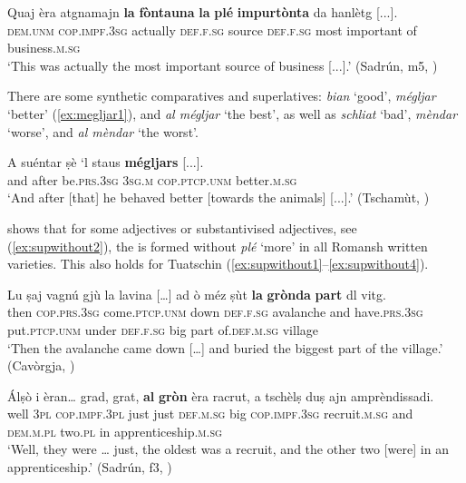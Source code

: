 \ea
\label{ex:sup3}
\gll Quaj èra atgnamajn \textbf{la} \textbf{fòntauna} \textbf{la} \textbf{plé} \textbf{impurtònta} da hanlètg [...].\\
\textsc{dem.unm} \textsc{cop.impf.3sg} actually  \textsc{def.f.sg} source \textsc{def.f.sg} most important of business.\textsc{m.sg}\\
\glt `This was actually the most important source of  business [...].' (Sadrún, m5, )
\z

There are some synthetic comparatives and superlatives: \textit{bian} `good', \textit{mégljar} `better' (\ref{ex:megljar1}), and  \textit{al mégljar} `the best', as well as \textit{schliat} `bad', \textit{mèndar} `worse', and \textit{al mèndar} `the worst'.

\ea
\label{ex:megljar1}
\gll A suéntar ṣè `l staus \textbf{mégljars} [...].\\
and after be\textsc{.prs.3sg} \textsc{3sg.m} \textsc{cop.ptcp.unm} better.\textsc{m.sg}\\
\glt`And after [that] he behaved better [towards the animals] [...].' (Tschamùt, \citealt[20]{Büchli1966})
\z

\citet[233--250]{Linder1987} shows that for some adjectives or substantivised adjectives, see (\ref{ex:supwithout2}), the  is formed without \textit{plé} `more' in all Romansh written varieties. This also holds for Tuatschin (\ref{ex:supwithout1}--\ref{ex:supwithout4}).

\ea
\label{ex:supwithout1}
\gll    Lu ṣaj vagnú gjù la lavina […] ad ò méz ṣùt \textbf{la} \textbf{grònda} \textbf{part} dl vitg.\\
then \textsc{cop.prs.3sg} come.\textsc{ptcp.unm} down \textsc{def.f.sg} avalanche {} and have.\textsc{prs.3sg} put.\textsc{ptcp.unm} under \textsc{def.f.sg} big part of.\textsc{def.m.sg} village\\
\glt `Then the avalanche came down […] and buried the biggest part of the village.' (Cavòrgja, \citealt[120]{Büchli1966})
\z

\ea\label{ex:supwithout2}
\gll   Álṣò i èran… grad, grat, \textbf{al} \textbf{gròn} èra racrut, a tschèlṣ duṣ ajn amprèndissadi. \\
well \textsc{3pl} \textsc{cop.impf.3pl} just just \textsc{def.m.sg} big \textsc{cop.impf.3sg} recruit.\textsc{m.sg} and  \textsc{dem.m.pl} two.\textsc{pl} in apprenticeship.\textsc{m.sg} \\
\glt `Well, they were … just, the oldest was a recruit, and the other two [were] in an apprenticeship.' (Sadrún, f3, )
\z

